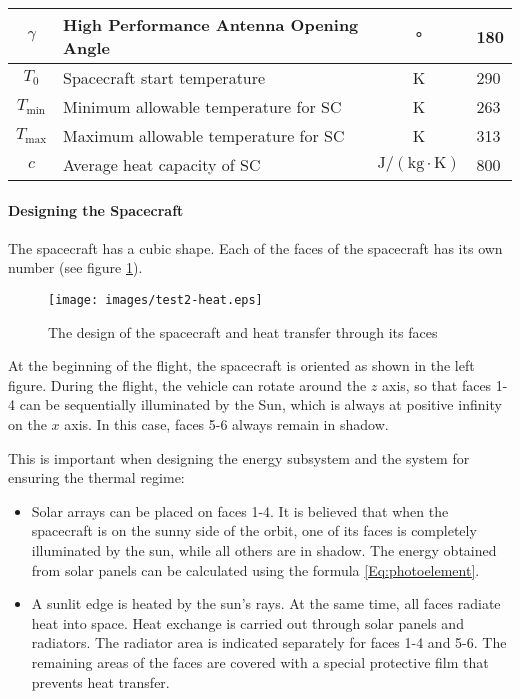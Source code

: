 \documentclass[12pt,a4paper]{article}
\begin{document}
\begin{center}
\begin{longtable}{ |c|p{5cm}|c|p{5cm}| }
  \hline
  $\gamma$ & High Performance Antenna Opening Angle & ° & 180\\
  \hline
  $T_0$ & Spacecraft start temperature & K & 290\\
  \hline
  $T_{\text{min}}$ & Minimum allowable temperature for SC & K & 263\\
  \hline
  $T_{\text{max}}$ & Maximum allowable temperature for SC & K & 313\\
  \hline
  $c$ & Average heat capacity of SC & $\text{J} / (\text{kg} \cdot \text{K})$ & 800\\
  \hline
\end{longtable}
\end{center}

\paragraph{Designing the Spacecraft}

The spacecraft has a cubic shape. Each of the faces of the spacecraft has its own number (see figure
\ref{Pic:test2-heat}).

\begin{figure}[tbh]
  \begin{center}
    \texttt{[image: images/test2-heat.eps]}
    \caption{The design of the spacecraft and heat transfer through its faces}
    \label{Pic:test2-heat}
  \end{center}
\end{figure}

At the beginning of the flight, the spacecraft is oriented as shown in the left figure. During the flight, the vehicle can rotate around the $z$ axis, so that faces 1-4 can be sequentially illuminated by the Sun, which is always at positive infinity on the $x$ axis. In this case, faces 5-6 always remain in shadow.

This is important when designing the energy subsystem and the system for ensuring the thermal regime:

\begin{itemize}
\item Solar arrays can be placed on faces 1-4. It is believed that when the spacecraft is on the sunny side of the orbit, one of its faces is completely illuminated by the sun, while all others are in shadow. The energy obtained from solar panels can be calculated using the formula \ref{Eq:photoelement}.
\item A sunlit edge is heated by the sun's rays. At the same time, all faces radiate heat into space. Heat exchange is carried out through solar panels and radiators. The radiator area is indicated separately for faces 1-4 and 5-6. The remaining areas of the faces are covered with a special protective film that prevents heat transfer.
\end{itemize}
\end{document}
